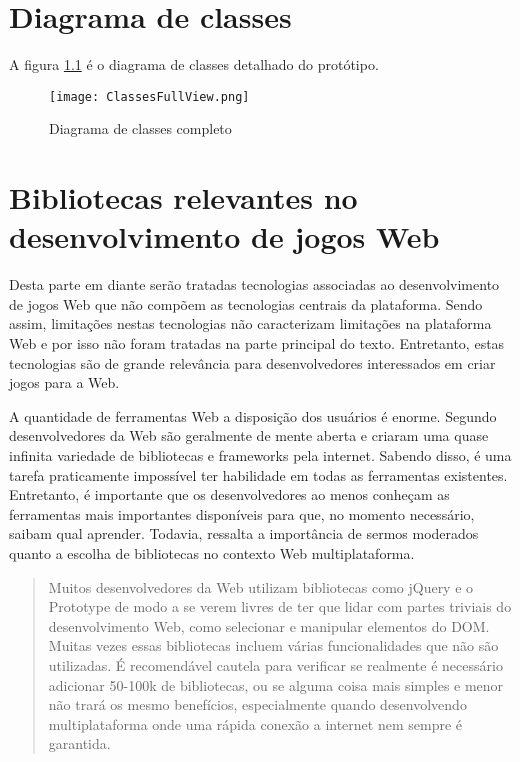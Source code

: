\chapter{Diagrama de classes}

A figura \ref{fig:fullDiagram} é o diagrama de classes detalhado do protótipo.
\begin{figure}[H]
    \centering
    \texttt{[image: ClassesFullView.png]}
	\caption{Diagrama de classes completo}
    \label{fig:fullDiagram}
\end{figure}

\chapter{Bibliotecas relevantes no desenvolvimento de jogos Web}

Desta parte em diante serão tratadas tecnologias associadas ao
desenvolvimento de jogos Web que não compõem as tecnologias centrais
da plataforma. Sendo assim, limitações nestas tecnologias não
caracterizam limitações na plataforma Web e por isso não foram tratadas
na parte principal do texto. Entretanto, estas tecnologias são de grande relevância para
desenvolvedores interessados em criar jogos para a Web.

A quantidade de ferramentas Web a disposição dos usuários é
enorme. Segundo \citet{html5mostwanted} desenvolvedores da Web são
geralmente de mente aberta e criaram uma quase infinita variedade de
bibliotecas e frameworks pela internet. Sabendo disso, é uma tarefa
praticamente impossível ter habilidade em todas as ferramentas
existentes. Entretanto, é importante que os desenvolvedores ao menos
conheçam as ferramentas mais importantes disponíveis para que, no
momento necessário, saibam qual aprender. Todavia, \citet{creatingFun}
ressalta a importância de sermos moderados quanto a escolha de
bibliotecas no contexto Web multiplataforma.

\begin{quote}
Muitos desenvolvedores da Web utilizam bibliotecas como jQuery e o
Prototype de modo a se verem livres de ter que lidar com
partes triviais do desenvolvimento Web, como selecionar e
manipular elementos do DOM. Muitas vezes essas bibliotecas incluem
várias funcionalidades que não são utilizadas. É recomendável
cautela para verificar se realmente é necessário adicionar 50-100k
de bibliotecas, ou se alguma coisa mais simples e menor não trará
os mesmo benefícios, especialmente quando desenvolvendo
multiplataforma onde uma rápida conexão a internet nem sempre é
garantida.
\end{quote}

